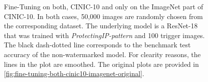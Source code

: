 \begin{figure}
\caption{Fine-Tuning on both, CINIC-10 and only on the ImageNet part of CINIC-10. In both cases, 50,000 images are randomly chosen from the corresponding dataset. The underlying model is a ResNet-18 that was trained with \textit{ProtectingIP-pattern} and 100 trigger images. The black dash-dotted line corresponds to the benchmark test accuracy of the non-watermarked model. For clearity reasons, the lines in the plot are smoothed. The original plots are provided in \cref{fig:fine-tuning-both-cinic10-imagenet-original}.}
\label{fig:fine-tuning-both-cinic10-imagenet}

\end{figure}